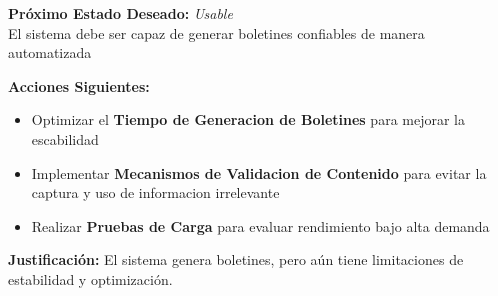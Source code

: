 \documentclass[12pt]{article}
\begin{document}
\textbf{Próximo Estado Deseado:} \textit{Usable} \\
El sistema debe ser capaz de generar boletines confiables 
de manera automatizada

\vspace{0.5cm}

\textbf{Acciones Siguientes:}
\begin{itemize}
    \item Optimizar el \textbf{Tiempo de Generacion de 
    Boletines}  para mejorar la escabilidad 
    \item Implementar \textbf{Mecanismos de Validacion de Contenido}
    para evitar la captura y uso de informacion irrelevante
    \item Realizar \textbf{Pruebas de Carga} para evaluar 
    rendimiento bajo alta demanda
\end{itemize}

\vspace{0.3cm}

\textbf{Justificación:} El sistema genera boletines, 
pero aún tiene limitaciones de estabilidad y optimización.
\end{document}
